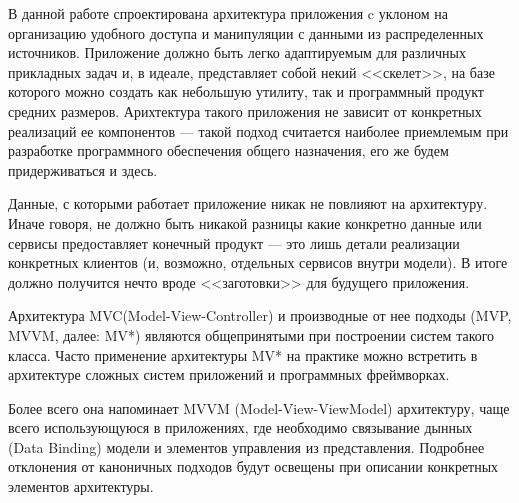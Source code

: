 
В данной работе спроектирована архитектура приложения c уклоном
на организацию удобного доступа и манипуляции с данными из распределенных источников. Приложение
должно быть легко адаптируемым для различных прикладных задач и, в
идеале,  представляет собой некий <<скелет>>, на базе которого
можно создать как небольшую утилиту, так и программный продукт средних
размеров. Арихтектура такого приложения не зависит от
конкретных реализаций ее компонентов --- такой подход считается наиболее
приемлемым при разработке программного обеспечения общего назначения,
его же будем придерживаться и здесь.

Данные, с которыми работает приложение никак не повлияют на
архитектуру. Иначе говоря, не должно быть никакой разницы какие
конкретно  данные или сервисы предоставляет конечный продукт --- это
лишь детали реализации конкретных клиентов (и, возможно,
отдельных сервисов внутри модели). В итоге должно получится нечто вроде
<<заготовки>> для будущего приложения.

Архитектура MVC(Model-View-Controller) и производные от нее подходы
(MVP, MVVM, далее: MV*) являются  общепринятыми при построении систем такого
класса. Часто применение архитектуры MV* на практике можно встретить в
архитектуре сложных систем приложений и программных фреймворках.

Более всего она напоминает MVVM
(Model-View-ViewModel) архитектуру, чаще всего использующуюся в
приложениях, где необходимо связывание дынных (Data Binding) модели и элементов
управления из представления. Подробнее отклонения от каноничных 
подходов будут освещены при описании конкретных элементов архитектуры.

